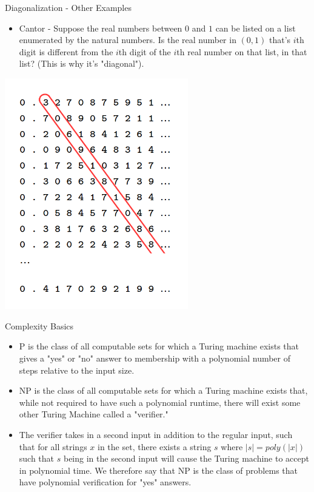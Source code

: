 \documentclass[aspectratio=169]{beamer}
\begin{document}
\begin{frame}{Diagonalization - Other Examples}
  \begin{itemize}
    \item Cantor - Suppose the real numbers between $0$ and $1$ can be listed on a list enumerated by the natural numbers. Is the real number in $(0, 1)$ that's $i$th digit is different from the $i$th digit of the $i$th real number on that list, in that list? (This is why it's "diagonal").
  \end{itemize}
  \begin{center}
    \includegraphics[width=0.6\textwidth, height=0.6\textheight, keepaspectratio]{uncountable.png}
  \end{center}
\end{frame}

\begin{frame}{Complexity Basics}
  
  \begin{itemize}
    \item P is the class of all computable sets for which a Turing machine exists that gives a "yes" or "no" answer to membership with a polynomial number of steps relative to the input size. \pause
    \item NP is the class of all computable sets for which a Turing machine exists that, while not required to have such a polynomial runtime, there will exist some other Turing Machine called a "verifier." \pause
    \item The verifier takes in a second input in addition to the regular input, such that for all strings $x$ in the set, there exists a string $s$ where $|s| = poly(|x|)$ such that $s$ being in the second input will cause the Turing machine to accept in polynomial time. We therefore say that NP is the class of problems that have polynomial verification for "yes" answers.
  \end{itemize}
\end{frame}
\end{document}

